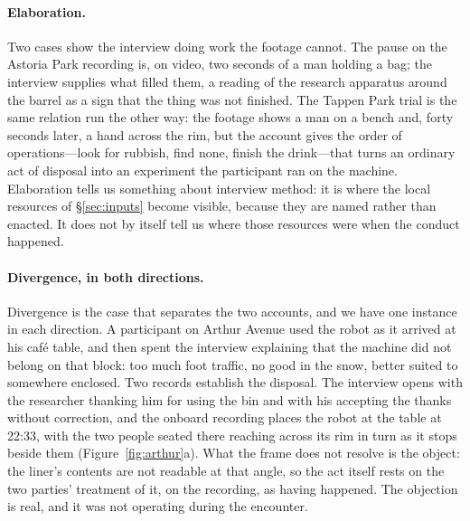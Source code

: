\paragraph{Elaboration.}
Two cases show the interview doing work the footage cannot. The pause on the
Astoria Park recording is, on video, two seconds of a man holding a bag; the
interview supplies what filled them, a reading of the research apparatus around
the barrel as a sign that the thing was not finished. The Tappen Park trial is
the same relation run the other way: the footage shows a man on a bench and,
forty seconds later, a hand across the rim, but the account gives the order of
operations---look for rubbish, find none, finish the drink---that turns an
ordinary act of disposal into an experiment the participant ran on the
machine. Elaboration tells us something about interview
method: it is where the local resources of \S\ref{sec:inputs} become visible,
because they are named rather than enacted. It does not by itself tell us where
those resources were when the conduct happened.

\paragraph{Divergence, in both directions.}
Divergence is the case that separates the two accounts, and we have one instance
in each direction. A participant on Arthur Avenue used the robot as it arrived at
his caf\'e table, and then spent the interview explaining that the machine did
not belong on that block: too much foot traffic, no good in the snow, better
suited to somewhere enclosed. Two records establish the disposal. The interview
opens with the researcher thanking him for using the bin and with his accepting
the thanks without correction, and the onboard recording places the robot at
the table at 22:33, with the two people seated there reaching across its rim
in turn as it stops beside them (Figure~\ref{fig:arthur}a). What the frame does
not resolve is the object:
the liner's contents are not readable at that angle, so the act itself rests
on the two parties' treatment of it, on the recording, as having happened. The
objection is real, and it was not operating during the encounter.


